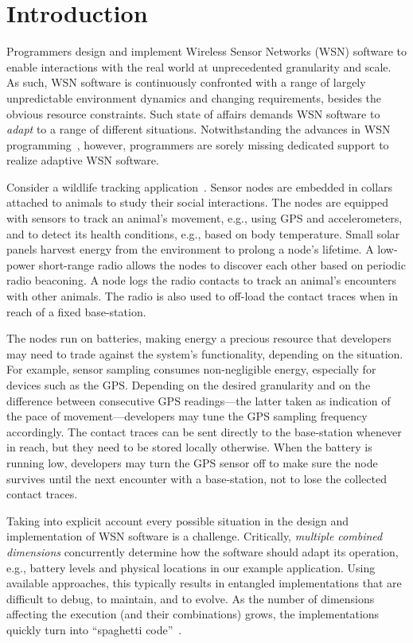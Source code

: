 
\section{Introduction} 

Programmers design and implement Wireless Sensor Networks (WSN)
software to enable interactions with the real world at unprecedented
granularity and scale. As such, WSN software is continuously confronted
with a range of largely unpredictable environment dynamics and
changing requirements, besides the obvious resource constraints. Such
state of affairs demands WSN software to \emph{adapt} to a range of
different situations. Notwithstanding the advances in WSN
programming~\cite{mottola10:survey}, however, programmers are sorely
missing dedicated support to realize adaptive WSN
software.

 Consider a wildlife tracking
application~\cite{pasztor10:selective}. Sensor nodes are embedded in
collars attached to animals to study their social interactions. The
nodes are equipped with sensors to track an animal's movement, e.g.,
using GPS and accelerometers, and to detect its health conditions,
e.g., based on body temperature. Small solar panels harvest energy
from the environment to prolong a node's lifetime. A low-power
short-range radio allows the nodes to discover each other based on
periodic radio beaconing.  A node logs the radio contacts to track an
animal's encounters with other animals. The radio is also used to
off-load the contact traces when in reach of a fixed base-station.

The nodes run on batteries, making energy a precious resource that
developers may need to trade against the system's functionality,
depending on the situation. For example, sensor sampling consumes
non-negligible energy, especially for devices such as the
GPS. Depending on the desired granularity and on the difference
between consecutive GPS readings---the latter taken as indication of
the pace of movement---developers may tune the GPS sampling frequency
accordingly. The contact traces can be sent directly to the
base-station whenever in reach, but they need to be stored locally
otherwise.  When the battery is running low, developers may turn the
GPS sensor off to make sure the node survives until the next encounter with
a base-station, not to lose the collected contact traces.

 Taking into explicit account every possible
situation in the design and implementation of WSN software is a
challenge. Critically, \emph{multiple combined dimensions}
concurrently determine how the software should adapt its operation,
e.g., battery levels and physical locations in our example
application. Using available approaches, this typically results in
entangled implementations that are difficult to debug, to maintain,
and to evolve.  As the number of dimensions affecting the execution
(and their combinations) grows, the implementations quickly turn into
``spaghetti code''~\cite{finne10improving}.

